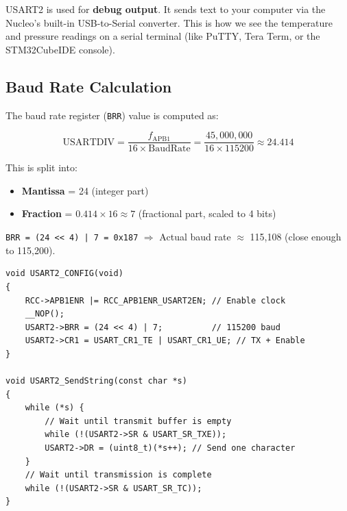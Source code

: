 \documentclass[12pt, a4paper]{article}
\begin{document}
USART2 is used for \textbf{debug output}. It sends text to your computer via the Nucleo's built-in USB-to-Serial converter. This is how we see the temperature and pressure readings on a serial terminal (like PuTTY, Tera Term, or the STM32CubeIDE console).

\subsection{Baud Rate Calculation}

\begin{conceptbox}
The baud rate register (\texttt{BRR}) value is computed as:

\[
\text{USARTDIV} = \frac{f_{\text{APB1}}}{16 \times \text{BaudRate}} = \frac{45{,}000{,}000}{16 \times 115200} \approx 24.414
\]

This is split into:
\begin{itemize}[leftmargin=2em]
    \item \textbf{Mantissa} = 24 (integer part)
    \item \textbf{Fraction} = $0.414 \times 16 \approx 7$ (fractional part, scaled to 4 bits)
\end{itemize}

\texttt{BRR = (24 << 4) | 7 = 0x187} \quad $\Rightarrow$ Actual baud rate $\approx$ 115,108 (close enough to 115,200).
\end{conceptbox}

\begin{codebox}
\begin{lstlisting}[style=CStyle]
void USART2_CONFIG(void)
{
    RCC->APB1ENR |= RCC_APB1ENR_USART2EN; // Enable clock
    __NOP();
    USART2->BRR = (24 << 4) | 7;          // 115200 baud
    USART2->CR1 = USART_CR1_TE | USART_CR1_UE; // TX + Enable
}

void USART2_SendString(const char *s)
{
    while (*s) {
        // Wait until transmit buffer is empty
        while (!(USART2->SR & USART_SR_TXE));
        USART2->DR = (uint8_t)(*s++); // Send one character
    }
    // Wait until transmission is complete
    while (!(USART2->SR & USART_SR_TC));
}
\end{lstlisting}
\end{codebox}

\end{document}

